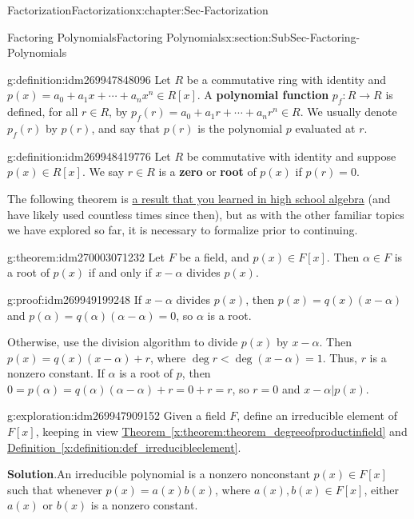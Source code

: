 \documentclass[oneside,10pt,]{book}
\newcommand{\terminology}[1]{\textbf{#1}}
\numberwithin{equation}{section}
\newcommand{\lt}{<}
\begin{document}
\begin{chapterptx}{Factorization}{}{Factorization}{}{}{x:chapter:Sec-Factorization}
\begin{sectionptx}{Factoring Polynomials}{}{Factoring Polynomials}{}{}{x:section:SubSec-Factoring-Polynomials}
\begin{definition}{}{g:definition:idm269947848096}%
Let \(R\) be a commutative ring with identity and \(p(x) = a_0 + a_1 x + \cdots + a_n x^n \in R[x]\). A \terminology{polynomial function} \(p_f : R \to R\) is defined, for all \(r\in R\), by \(p_f(r) = a_0 + a_1 r + \cdots + a_n r^n \in R\). We usually denote \(p_f(r)\) by \(p(r)\), and say that \(p(r)\) is the polynomial \(p\) evaluated at \(r\).%
\end{definition}
\begin{definition}{}{g:definition:idm269948419776}%
Let \(R\) be commutative with identity and suppose \(p(x) \in R[x]\). We say \(r\in R\) is a \terminology{zero} or \terminology{root} of \(p(x)\) if \(p(r) = 0\).%
\end{definition}
The following theorem is \href{http://www.corestandards.org/Math/Content/HSA/APR/B/2/}{a result that you learned in high school algebra} (and have likely used countless times since then), but as with the other familiar topics we have explored so far, it is necessary to formalize prior to continuing.%
\begin{theorem}{}{}{g:theorem:idm270003071232}%
Let \(F\) be a field, and \(p(x)\in F[x]\). Then \(\alpha\in F\) is a root of \(p(x)\) if and only if \(x-\alpha\) divides \(p(x)\).%
\end{theorem}
\begin{proofptx}{}{g:proof:idm269949199248}
If \(x-\alpha\) divides \(p(x)\), then \(p(x) = q(x) (x-\alpha)\) and \(p(\alpha) = q(\alpha) (\alpha - \alpha) = 0\), so \(\alpha\) is a root.%
\par
Otherwise, use the division algorithm to divide \(p(x)\) by \(x-\alpha\). Then \(p(x) = q(x)(x-\alpha) + r\), where \(\deg r \lt \deg (x-\alpha) = 1\). Thus, \(r\) is a nonzero constant. If \(\alpha\) is a root of \(p\), then \(0 = p(\alpha) = q(\alpha) (\alpha - \alpha) + r = 0 + r = r\), so \(r=0\) and \(x-\alpha | p(x)\).%
\end{proofptx}
\begin{exploration}{}{g:exploration:idm269947909152}%
Given a field \(F\), define an irreducible element of \(F[x]\), keeping in view \hyperref[x:theorem:theorem_degreeofproductinfield]{Theorem~\ref{x:theorem:theorem_degreeofproductinfield}} and \hyperref[x:definition:def_irreducibleelement]{Definition~\ref{x:definition:def_irreducibleelement}}.%
\par\smallskip%
\noindent\textbf{Solution}.\hypertarget{g:solution:idm270001183200}{}\quad{}An irreducible polynomial is a nonzero nonconstant \(p(x)\in F[x]\) such that whenever \(p(x) = a(x) b(x)\), where \(a(x), b(x) \in F[x]\), either \(a(x)\) or \(b(x)\) is a nonzero constant.%

\end{exploration}
\end{sectionptx}
\end{chapterptx}
\end{document}
